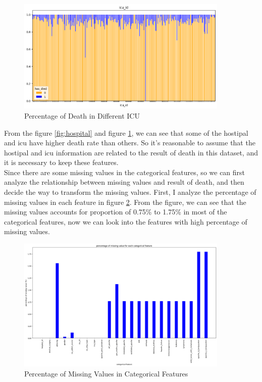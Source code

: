 \documentclass[a4paper, oneside, final, 12pt]{scrartcl} %
\begin{document}
\begin{figure}[ht]
  \centering
  \includegraphics[width=0.9\textwidth]{"./image/dataset/icu_id_dis.png"}
  \caption{Percentage of Death in Different ICU}
  \label{fig:icu}
\end{figure}

From the figure \ref{fig:hospital} and figure \ref{fig:icu}, 
we can see that some of the hostipal and icu have higher death rate than others.
So it's reasonable to assume that the hostipal and icu information are related to the result of death in this dataset,
and it is necessary to keep these features. \\

Since there are some missing values in the categorical features, 
so we can first analyze the relationship between missing values and result of death,
and then decide the way to transform the missing values.
First, I analyze the percentage of missing values in each feature in figure \ref{fig:missing_cat}.
From the figure, we can see that the missing values accounts for proportion of 0.75\% to 1.75\%
in most of the categorical features, now we can look into the 
features with high percentage of missing values.

\begin{figure}[ht]
  \centering
  \includegraphics[width=0.9\textwidth]{"./image/dataset/cat_nan_percentage.png"}
  \caption{Percentage of Missing Values in Categorical Features}
  \label{fig:missing_cat}
\end{figure}
\end{document}
